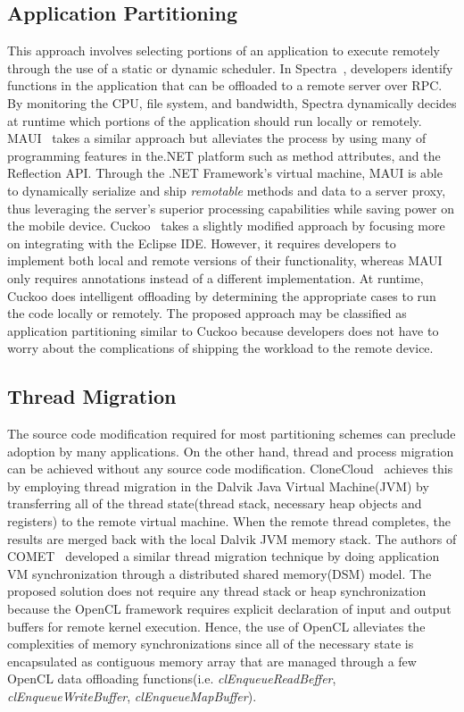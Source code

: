 \subsection{Application Partitioning}
\label{intro:app_partitioning}
%
This approach involves selecting portions of an application to execute
remotely through the use of a static or dynamic scheduler.
%
In Spectra~\cite{spectra}, developers identify functions in the
application that  can be offloaded to a remote server over RPC.
%
By monitoring the CPU, file system, and bandwidth, Spectra dynamically
decides at runtime which portions of the application should run locally
or remotely.
%
MAUI~\cite{maui} takes a similar approach but alleviates the process by
using many of programming features in the.NET platform such as method
attributes, and the Reflection API.
%
Through the .NET Framework's virtual machine, MAUI is able to
dynamically serialize and ship \textit{remotable} methods and data to a
server proxy, thus leveraging the server's superior processing
capabilities while saving power on the mobile device.
%
Cuckoo~\cite{cuckoo} takes a slightly modified approach by focusing more
on integrating with the Eclipse IDE.
%
However, it requires developers to implement both local and remote
versions of their functionality, whereas MAUI only requires annotations
instead of a different implementation.
%
At runtime, Cuckoo does intelligent offloading by determining the
appropriate cases to run the code locally or remotely.
%
The proposed approach may be classified as application partitioning
similar to Cuckoo because developers does not have to worry about the
complications of shipping the workload to the remote device.
%
\subsection{Thread Migration}
\label{intro:thr_migration}
%
The source code modification required for most partitioning schemes can
preclude adoption by many applications.
On the other hand, thread and process migration can be achieved without
any source code modification.
%
CloneCloud~\cite{clonecloud} achieves this by  employing thread
migration in the Dalvik Java Virtual Machine(JVM) by transferring all of
the thread state(thread stack, necessary heap objects and registers) to
the remote virtual machine.
%
When the remote thread completes, the results are merged back with the
local Dalvik JVM memory stack.
%
The authors of COMET~\cite{comet} developed a similar thread migration
technique by doing application VM synchronization through a distributed
shared memory(DSM) model.
%
The proposed solution does not require any thread stack or heap
synchronization because the OpenCL framework requires explicit
declaration of input and output buffers for remote kernel execution.
%
Hence, the use of OpenCL alleviates the complexities of memory
synchronizations since all of the necessary state is encapsulated as
contiguous memory array that are managed through a few OpenCL data
offloading functions(i.e. \textit{clEnqueueReadBeffer},
\textit{clEnqueueWriteBuffer}, \textit{clEnqueueMapBuffer}).
%
